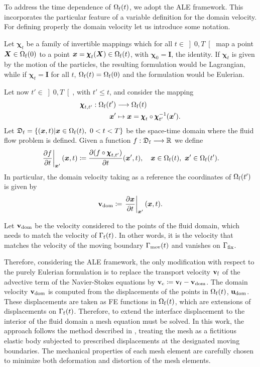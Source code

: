 \documentclass[11pt,english]{article}
\def\X{\pmb{X}}                             %
\def\x{\pmb{x}}                             %
\def\map{{\pmb\chi}}
\def\mapt{{\pmb\chi}_t}
\def\X{\boldsymbol{X}}
\def\x{\boldsymbol{x}}
\def\xs{\boldsymbol{x}}
\def\domainfluid{\Omega_{\rm{f}}}
\def\boundaryfluid{\Gamma_{\rm{f}}}
\def\vfluid{\vb{v}_{\rm{f}}}               %
\def\vfluiddom{\vb{v}_{\mathrm{dom}}}      %
\def\ufluiddom{\vb{u}_{\mathrm{dom}}}      %
\def\vfluidc{\vb{v}_{\rm{c}}}              %
\def\timeint{\left ] 0,T\right[}                         %
\def\cl{\nonumber\\}
\def\el{{\nonumber}}
\begin{document}
To address the time dependence of $\domainfluid(t)$, we adopt the ALE framework. This incorporates the particular feature of a variable definition for the domain velocity. For defining properly the domain velocity let us introduce some notation.

Let $\mapt$ be a family of invertible mappings which for all $t\in \timeint$ map a point $\X\in\domainfluid(0)$ to a point $\x = \mapt(\X)\in \domainfluid(t)$, with $\map_0 = {\boldsymbol I}$, the identity. If $\mapt$ is given by the motion of the particles, the resulting formulation would be Lagrangian, while if $\mapt = {\boldsymbol I}$ for all $t$,  $\domainfluid(t) = \domainfluid(0)$ and the formulation would be Eulerian. 

Let now $t'\in \timeint$, with $t'\leq t$, and consider the mapping
\begin{align}
\map_{t,t'} : \domainfluid(t') & \longrightarrow \domainfluid(t)\cl
              \x' & \mapsto  \x = \map_t\circ\map_{t'}^{-1}(\x').\el
\end{align}
Let $\mathfrak{D}_{\rm{f}} =\{(\x,t)\vert\x \in\domainfluid(t),~0<t<T\}$ be the space-time domain where the fluid flow problem is defined. Given a function $f : \mathfrak{D}_{\rm{f}} \longrightarrow {\mathbb R}$ we define
\begin{align}
\left.\frac{\partial f}{\partial t}\right\vert_{\xs'} (\x,t)
\coloneqq \frac{\partial (f\circ\map_{t,t'})}{\partial t}(\x',t),\quad \x\in\domainfluid(t), ~\x'\in \domainfluid(t').
\end{align}
In particular, the domain velocity taking as a reference the coordinates of $\domainfluid(t')$ is given by
\begin{align*}
 \vfluiddom \coloneqq \left.\frac{\partial \x}{\partial t}\right\vert_{\xs'} (\x,t).%
\end{align*}

Let $\vfluiddom$ be the velocity considered to the points of the fluid domain, which needs to match the velocity of $\boundaryfluid(t)$. In other words, it is the velocity that matches the velocity of the moving boundary $\Gamma_{\rm mov}(t)$ and vanishes on $\Gamma_{\rm fix}$. 

Therefore, considering the ALE framework, the only modification with respect to the purely Eulerian formulation is to replace the transport velocity $\vfluid$ of the advective term of the Navier-Stokes equations by $\vfluidc \coloneqq \vfluid - \vfluiddom$. The domain velocity $\vfluiddom$ is computed from the displacements of the points in $\domainfluid(t)$, $\ufluiddom$. These displacements are taken as FE functions in $\domainfluid(t)$, which are extensions of displacements on $\boundaryfluid(t)$. Therefore, to extend the interface displacement to the interior of the fluid domain a mesh equation must be solved. In this work, the approach follows the method described in \cite{Mesh}, treating the mesh as a fictitious elastic body subjected to prescribed displacements at the designated moving boundaries. The mechanical properties of each mesh element are carefully chosen to minimize both deformation and distortion of the mesh elements.
\end{document}
